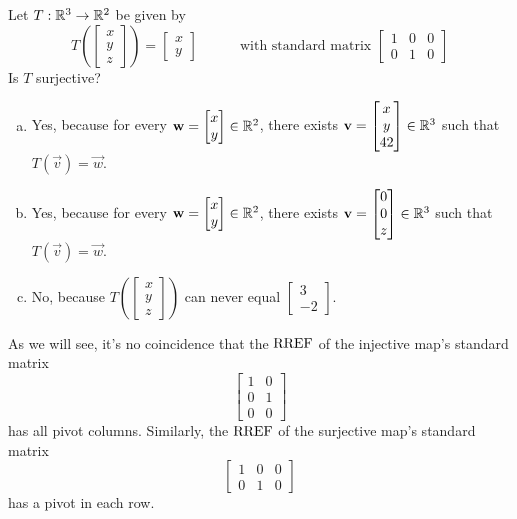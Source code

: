\begin{activity}{2}
Let $T: \mathbb{R}^3 \rightarrow \mathbb{R}^2$ be given by
\[
  T\left(\begin{bmatrix}x \\ y\\z \end{bmatrix} \right)
    =
  \begin{bmatrix} x \\ y \end{bmatrix}
    \hspace{3em}
    \text{with standard matrix }
  \begin{bmatrix} 1 & 0 & 0 \\ 0 & 1 & 0 \end{bmatrix}
\]
Is \(T\) surjective?
\begin{enumerate}[a)]
\item Yes, because for every \(\mathbf w=\begin{bmatrix}x\\y\end{bmatrix}\in\mathbb{R}^2\),
there exists \(\mathbf v=\begin{bmatrix}x\\y\\42\end{bmatrix}\in\mathbb{R}^3\) such that
\(T(\vec v)=\vec w\).
\item Yes, because for every \(\mathbf w=\begin{bmatrix}x\\y\end{bmatrix}\in\mathbb{R}^2\),
there exists \(\mathbf v=\begin{bmatrix}0\\0\\z\end{bmatrix}\in\mathbb{R}^3\) such that
\(T(\vec v)=\vec w\).
\item No, because 
  \(
    T\left(\begin{bmatrix}x\\y\\z\end{bmatrix}\right)
  \)
can never equal
  \(
  \begin{bmatrix} 3\\-2 \end{bmatrix}
  \).
\end{enumerate}
\end{activity}

\begin{observation}
As we will see, it's no coincidence that the \(\operatorname{RREF}\) of the
injective map's standard matrix
\[
  \begin{bmatrix} 1 & 0 \\ 0 & 1 \\ 0 & 0 \end{bmatrix}
\]
has all pivot columns. Similarly, the \(\operatorname{RREF}\) of the surjective map's
standard matrix
\[
  \begin{bmatrix} 1 & 0 & 0 \\ 0 & 1 & 0 \end{bmatrix}
\]
has a pivot in each row.
\end{observation}





